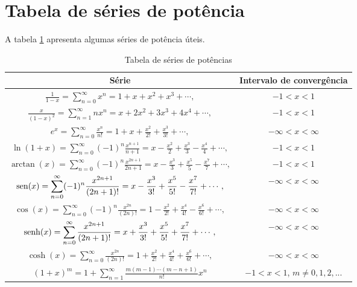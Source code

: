 \newpage
\section{Tabela de séries de potência}{\label{ap_A3}}
A tabela \ref{series_de_potencias} apresenta algumas séries de potência úteis.

\begin{table}%
\begin{small}
\begin{center}
{\renewcommand{\arraystretch}{2}%
\begin{tabular}{|c|c|}
\hline
 Série &Intervalo de convergência \\ 
\hline
 $\displaystyle \frac{1}{1-x}=\sum_{n=0}^\infty x^n=1+x+x^2+x^3+\cdots,$ &$\displaystyle -1<x<1$ \\[2ex] 
\hline
 $\displaystyle \frac{x}{(1-x)^2}=\sum_{n=1}^\infty n x^n=x+2x^2+3x^3+4x^4+\cdots,$ &$\displaystyle -1<x<1$ \\[2ex] 
\hline
 $\displaystyle e^x=\sum_{n=0}^\infty \frac{x^n}{n!}=1+x+\frac{x^2}{2!}+\frac{x^3}{3!}+\cdots,$ &$\displaystyle -\infty<x<\infty$ \\[2ex] 
\hline
 $\displaystyle \ln(1+x)=\sum_{n=0}^\infty(-1)^n \frac{x^{n+1}}{n+1}=x-\frac{x^2}{2}+\frac{x^3}{3}-\frac{x^4}{4}+\cdots,$ &$\displaystyle -1<x<1$ \\[2ex] 
\hline
 $\displaystyle \arctan(x)=\sum_{n=0}^\infty(-1)^n \frac{x^{2n+1}}{2n+1}=x-\frac{x^3}{3}+\frac{x^5}{5}-\frac{x^7}{7}+\cdots,$ &$\displaystyle -1<x<1$ \\[2ex] 
\hline
 $\displaystyle \operatorname{sen}(x)=\sum_{n=0}^\infty(-1)^n \frac{x^{2n+1}}{(2n+1)!}=x-\frac{x^3}{3!}+\frac{x^5}{5!}-\frac{x^7}{7!}+\cdots,$ &$\displaystyle -\infty<x<\infty$ \\[2ex] 
\hline
 $\displaystyle \cos(x)=\sum_{n=0}^\infty(-1)^n \frac{x^{2n}}{(2n)!}=1-\frac{x^2}{2!}+\frac{x^4}{4!}-\frac{x^6}{6!}+\cdots,$ &$\displaystyle -\infty<x<\infty$ \\[2ex]
\hline
 $\displaystyle \operatorname{senh}(x)=\sum_{n=0}^\infty \frac{x^{2n+1}}{(2n+1)!}=x+\frac{x^3}{3!}+\frac{x^5}{5!}+\frac{x^7}{7!}+\cdots,$ &$\displaystyle -\infty<x<\infty$ \\[2ex] 
\hline
 $\displaystyle \cosh(x)=\sum_{n=0}^\infty \frac{x^{2n}}{(2n)!}=1+\frac{x^2}{2!}+\frac{x^4}{4!}+\frac{x^6}{6!}+\cdots,$ &$\displaystyle -\infty<x<\infty$ \\[2ex] 
\hline
 $\displaystyle (1+x)^m=1+\sum_{n=1}^\infty \frac{m(m-1)\cdots (m-n+1)}{n!}x^n$ &$\displaystyle -1<x<1$, $m\neq 0,1,2,...$ \\[2ex] 
\hline
\end{tabular}}
\caption{\label{series_de_potencias}Tabela de séries de potências}
\end{center}
\end{small}
\end{table}	



%